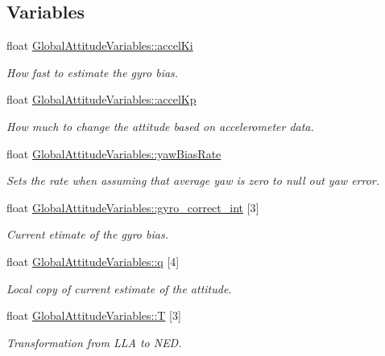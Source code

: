 \subsection*{\-Variables}
\begin{DoxyCompactItemize}
\item 
float \hyperlink{group___state_estimation_filters_ga0a9a06d18d9d208192de6edeed98fbe8}{\-Global\-Attitude\-Variables\-::accel\-Ki}
\begin{DoxyCompactList}\small\item\em \-How fast to estimate the gyro bias. \end{DoxyCompactList}\item 
float \hyperlink{group___state_estimation_filters_gaf9246ddec8582b6b47b752019c29b2e4}{\-Global\-Attitude\-Variables\-::accel\-Kp}
\begin{DoxyCompactList}\small\item\em \-How much to change the attitude based on accelerometer data. \end{DoxyCompactList}\item 
float \hyperlink{group___state_estimation_filters_ga0c53c008608a5724b2d563fd5b560905}{\-Global\-Attitude\-Variables\-::yaw\-Bias\-Rate}
\begin{DoxyCompactList}\small\item\em \-Sets the rate when assuming that average yaw is zero to null out yaw error. \end{DoxyCompactList}\item 
float \hyperlink{group___state_estimation_filters_gac754011cf55a0c78cb770e48567802ba}{\-Global\-Attitude\-Variables\-::gyro\-\_\-correct\-\_\-int} \mbox{[}3\mbox{]}
\begin{DoxyCompactList}\small\item\em \-Current etimate of the gyro bias. \end{DoxyCompactList}\item 
float \hyperlink{group___state_estimation_filters_ga34a6662a3aea49780925afa629a917cf}{\-Global\-Attitude\-Variables\-::q} \mbox{[}4\mbox{]}
\begin{DoxyCompactList}\small\item\em \-Local copy of current estimate of the attitude. \end{DoxyCompactList}\item 
float \hyperlink{group___state_estimation_filters_ga45b3fda0427f0fab27b88df83ae9108d}{\-Global\-Attitude\-Variables\-::\-T} \mbox{[}3\mbox{]}
\begin{DoxyCompactList}\small\item\em \-Transformation from \-L\-L\-A to \-N\-E\-D. \end{DoxyCompactList}\item 

\end{DoxyCompactItemize}
